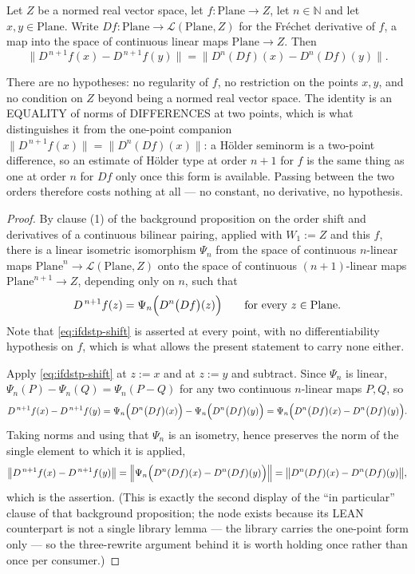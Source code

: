 \begin{lemma}
Let $Z$ be a normed real vector space, let $f\colon\mathrm{Plane}\to Z$, let $n\in\mathbb{N}$ and
let $x,y\in\mathrm{Plane}$.  Write $Df\colon\mathrm{Plane}\to\mathcal{L}(\mathrm{Plane},Z)$ for
the Fr\'echet derivative of $f$, a map into the space of continuous linear maps
$\mathrm{Plane}\to Z$.  Then
\[
  \bigl\lVert D^{\,n+1}f(x)-D^{\,n+1}f(y)\bigr\rVert
  =\bigl\lVert D^{n}(Df)(x)-D^{n}(Df)(y)\bigr\rVert .
\]

There are no hypotheses: no regularity of $f$, no restriction on the points $x,y$, and no
condition on $Z$ beyond being a normed real vector space.  The identity is an EQUALITY of norms
of DIFFERENCES at two points, which is what distinguishes it from the one-point companion
$\lVert D^{\,n+1}f(x)\rVert=\lVert D^{n}(Df)(x)\rVert$: a H\"older seminorm is a two-point
difference, so an estimate of H\"older type at order $n+1$ for $f$ is the same thing as one at
order $n$ for $Df$ only once this form is available.  Passing between the two orders therefore
costs nothing at all --- no constant, no derivative, no hypothesis.
\end{lemma}
\begin{proof}
By clause (1) of the background proposition on the order shift and derivatives of a continuous
bilinear pairing, applied with $W_1:=Z$ and this $f$, there is a linear isometric isomorphism
$\Psi_n$ from the space of continuous $n$-linear maps
$\mathrm{Plane}^{n}\to\mathcal{L}(\mathrm{Plane},Z)$ onto the space of continuous
$(n+1)$-linear maps $\mathrm{Plane}^{n+1}\to Z$, depending only on $n$, such that
\begin{equation}\label{eq:ifdstp-shift}
  D^{\,n+1}f(z)=\Psi_n\Bigl(D^{n}\bigl(Df\bigr)(z)\Bigr)
  \qquad\text{for every }z\in\mathrm{Plane}.
\end{equation}
Note that \eqref{eq:ifdstp-shift} is asserted at every point, with no differentiability
hypothesis on $f$, which is what allows the present statement to carry none either.

Apply \eqref{eq:ifdstp-shift} at $z:=x$ and at $z:=y$ and subtract.  Since $\Psi_n$ is linear,
$\Psi_n(P)-\Psi_n(Q)=\Psi_n(P-Q)$ for any two continuous $n$-linear maps $P,Q$, so
\[
  D^{\,n+1}f(x)-D^{\,n+1}f(y)
  =\Psi_n\Bigl(D^{n}\bigl(Df\bigr)(x)\Bigr)-\Psi_n\Bigl(D^{n}\bigl(Df\bigr)(y)\Bigr)
  =\Psi_n\Bigl(D^{n}\bigl(Df\bigr)(x)-D^{n}\bigl(Df\bigr)(y)\Bigr).
\]
Taking norms and using that $\Psi_n$ is an isometry, hence preserves the norm of the single
element to which it is applied,
\[
  \bigl\lVert D^{\,n+1}f(x)-D^{\,n+1}f(y)\bigr\rVert
  =\Bigl\lVert\Psi_n\Bigl(D^{n}(Df)(x)-D^{n}(Df)(y)\Bigr)\Bigr\rVert
  =\bigl\lVert D^{n}(Df)(x)-D^{n}(Df)(y)\bigr\rVert ,
\]
which is the assertion.  (This is exactly the second display of the ``in particular'' clause of
that background proposition; the node exists because its LEAN counterpart is not a single
library lemma --- the library carries the one-point form only --- so the three-rewrite argument
behind it is worth holding once rather than once per consumer.)
\end{proof}
